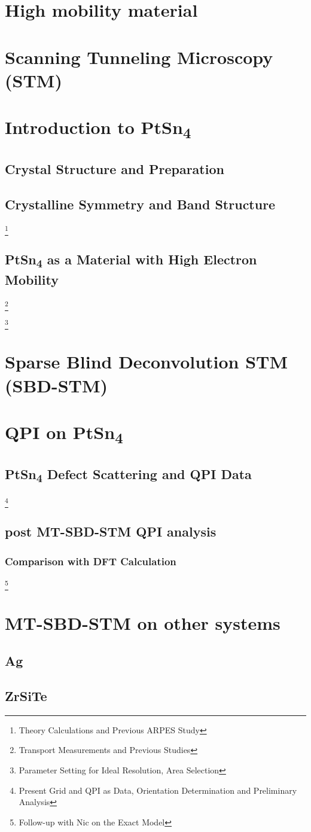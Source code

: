 \chapter{High mobility material}

\chapter{Scanning Tunneling Microscopy (STM)}
	

\chapter{Introduction to PtSn\textsubscript{4}}
	\section{Crystal Structure and Preparation}
	\section{Crystalline Symmetry and Band Structure} 
\footnote{Theory Calculations and Previous ARPES Study}
	\section{PtSn\textsubscript{4} as a Material with High Electron Mobility}
	\footnote{Transport Measurements and Previous Studies}




	\footnote{Parameter Setting for Ideal Resolution, Area Selection}

\chapter{Sparse Blind Deconvolution STM (SBD-STM)}
	
	

\chapter{QPI on PtSn\textsubscript{4}}
\section{PtSn\textsubscript{4} Defect Scattering and QPI Data}
\footnote{Present Grid and QPI as Data, Orientation Determination and Preliminary Analysis}
\section{post MT-SBD-STM QPI analysis}
\subsection{Comparison with DFT Calculation}
\footnote{Follow-up with Nic on the Exact Model}

\chapter{MT-SBD-STM on other systems}
\section{Ag}
\section{ZrSiTe}